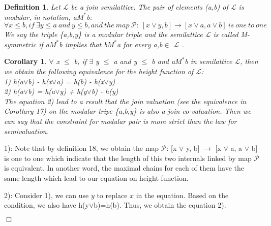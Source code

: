 \documentclass{article}
\newenvironment{proof}{\par \noindent {\bf Proof:}}{\begin{flushright}$\Box$\end{flushright}\par \noindent}
\newtheorem{definition}[theorem]{\bf Definition}
\newtheorem{corollary}[theorem]{\bf Corollary}
\begin{document}
\begin{definition}
Let $\mathcal{L}$ be a join semilattice. The pair of elements (a,b) of $\mathcal{L}$ is modular, in notation, a$M^{*}$b: $$\forall x \leq b, if\ \exists y \leq a\ and\ y \leq b, and\ the\ map\ \mathcal{P}:\ [x \vee y, b] \rightarrow [x \vee a, a \vee b]\ is\ one\ to\ one$$ We say the triple \{a,b,y\} is a modular triple and the semilattice $\mathcal{L}$ is called M-symmetric if a$M^{*}$b implies that b$M^{*}$a for every a,b$\in$ $\mathcal{L}$ .
\end{definition}

\begin{corollary}
$\forall$ x $\leq$ b, if $\exists$ y $\leq$ a and y $\leq$ b and a$M^{*}$b in semilattice $\mathcal{L}$, then we obtain the following equivalence for the height function of  $\mathcal{L}$:\\

1) h(a$\vee$b) - h(x$\vee$a) = h(b) - h(x$\vee$y)\\

2) h(a$\vee$b) = h(a$\vee$y) + h(y$\vee$b) - h(y)\\

The equation 2) lead to a result that the join valuation (see the equivalence in Corollary 17) on the modular tripe \{a,b,y\} is also a join co-valuation. Then we can say that the constraint for modular pair is more strict than the law for semivaluation.  

\end{corollary}

\begin{proof}
1): Note that by definition 18, we obtain the map $\mathcal{P}$: [x $\vee$ y, b] $\rightarrow$ [x $\vee$ a, a $\vee$ b] is one to one which indicate that the length of this two internals linked by map $\mathcal{P}$ is equivalent. In another word, the maximal chains for each of them have the same length which lead to our equation on height function.

2):  Consider 1), we can use $y$ to replace $x$ in the equation. Based on the condition, we also have  h(y$\vee$b)=h(b). Thus, we obtain the equation 2).

\end{proof}
\end{document}
